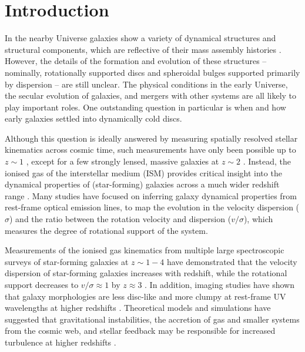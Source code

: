 \documentclass[longauth]{aa}
\begin{document}
\section{Introduction}

In the nearby Universe galaxies show a variety of dynamical structures and structural components, which are reflective of their mass assembly histories \citep[e.g.][]{Cappellari2016,vdSande2018,Falcon2019}. However, the details of the formation and evolution of these structures -- nominally, rotationally supported discs and spheroidal bulges supported primarily by dispersion -- are still unclear. The physical conditions in the early Universe, the secular evolution of galaxies, and mergers with other systems are all likely to play important roles. One outstanding question in particular is when and how early galaxies settled into dynamically cold discs. %


Although this question is ideally answered by measuring spatially resolved stellar kinematics across cosmic time, such measurements have only been possible up to $z\sim1$ \citep[e.g,][]{vanHoudt2021}, except for a few strongly lensed, massive galaxies at $z\sim2$ \citep{Newman2018}. Instead, the ionised gas of the interstellar medium (ISM) provides critical insight into the dynamical properties of (star-forming) galaxies across a much wider redshift range \citep[for a review, see][]{FSchreiber2020}. Many studies have focused on inferring galaxy dynamical properties from rest-frame optical emission lines, to map the evolution in the velocity dispersion ($\sigma$) and the ratio between the rotation velocity and dispersion ($v/\sigma$), which measures the degree of rotational support of the system. 

Measurements of the ionised gas kinematics from multiple large spectroscopic surveys of star-forming galaxies at $z\sim 1-4$ have demonstrated that the velocity dispersion of star-forming galaxies increases with redshift, while the rotational support decreases to $v/\sigma\approx1$ by $z\approx 3$ \citep[e.g.,][]{Wisnioski2015,Wisnioski2019,Stott2016,Simons2017,Turner2017,Price2020}. In addition, imaging studies have shown that galaxy morphologies are less disc-like and more clumpy at rest-frame UV wavelengths at higher redshifts \citep[e.g.,][]{vdWel2014,Guo2015,Zhang2019,Sattari2023}. Theoretical models and simulations have suggested that gravitational instabilities, the accretion of gas and smaller systems from the cosmic web, and stellar feedback may be responsible for increased turbulence at higher redshifts \citep[e.g.,][]{Dekel2009b,Genel2012,Ceverino2012,Krumholz2018}. 
\end{document}
